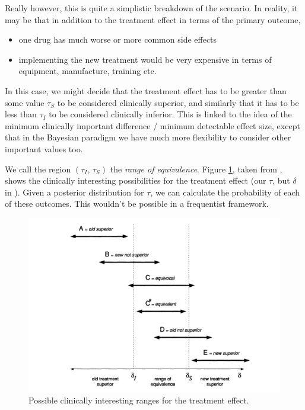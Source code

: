 \documentclass[
  openany]{book}
\providecommand{\tightlist}{%
  \setlength{\itemsep}{0pt}\setlength{\parskip}{0pt}}
\theoremstyle{definition}
\theoremstyle{definition}
\theoremstyle{definition}
\theoremstyle{definition}
\theoremstyle{remark}
\begin{document}
Really however, this is quite a simplistic breakdown of the scenario. In reality, it may be that in addition to the treatment effect in terms of the primary outcome,

\begin{itemize}
\tightlist
\item
  one drug has much worse or more common side effects
\item
  implementing the new treatment would be very expensive in terms of equipment, manufacture, training etc.
\end{itemize}

In this case, we might decide that the treatment effect has to be greater than some value \(\tau_S\) to be considered clinically superior, and similarly that it has to be less than \(\tau_I\) to be considered clinically inferior. This is linked to the idea of the minimum clinically important difference / minimum detectable effect size, except that in the Bayesian paradigm we have much more flexibility to consider other important values too.

We call the region \(\left(\tau_I,\,\tau_S\right)\) the \emph{range of equivalence}. Figure \ref{fig:spieg-ranges}, taken from \citet{spiegelhalter1994bayesian}, shows the clinically interesting possibilities for the treatment effect (our \(\tau\), but \(\delta\) in \citet{spiegelhalter1994bayesian}). Given a posterior distribution for \(\tau\), we can calculate the probability of each of these outcomes. This wouldn't be possible in a frequentist framework.

\begin{figure}
\includegraphics[width=17.06in]{images/bayesian_ranges} \caption{Possible clinically interesting ranges for the treatment effect.}\label{fig:spieg-ranges}
\end{figure}
\end{document}
